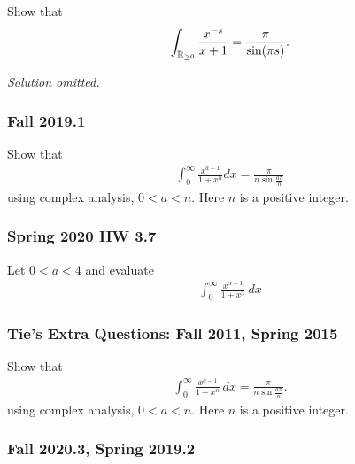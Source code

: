 \begin{problem}[?]

Show that
\begin{align*}
\int_{{\mathbb{R}}_{\geq 0}}{x^{-s} \over x+1} = {\pi \over \sin(\pi s)}
.\end{align*}

\end{problem}

\emph{Solution omitted.}

\hypertarget{fall-2019.1}{%
\subsubsection{Fall 2019.1}\label{fall-2019.1}}

Show that
\begin{align*}
\int_{0}^{\infty} \frac{x^{a-1}}{1+x^{n}} d x=\frac{\pi}{n \sin \frac{a \pi}{n}}
\end{align*}
using complex analysis, \(0<a<n\). Here \(n\) is a positive integer.

\hypertarget{spring-2020-hw-3.7}{%
\subsubsection{Spring 2020 HW 3.7}\label{spring-2020-hw-3.7}}

Let \(0<a<4\) and evaluate
\begin{align*}
\int_0^\infty \frac{x^{\alpha-1}}{1+x^3} ~dx
\end{align*}

\hypertarget{ties-extra-questions-fall-2011-spring-2015}{%
\subsubsection{Tie's Extra Questions: Fall 2011, Spring
2015}\label{ties-extra-questions-fall-2011-spring-2015}}

Show that
\begin{align*}
\displaystyle \int_0^\infty \frac{x^{a-1}} {1+x^n} \,dx=\frac{\pi}{n\sin \frac{a\pi}{n}}
.\end{align*}
using complex analysis, \(0< a < n\). Here \(n\) is a positive integer.

\hypertarget{fall-2020.3-spring-2019.2}{%
\subsubsection{Fall 2020.3, Spring
2019.2}\label{fall-2020.3-spring-2019.2}}

